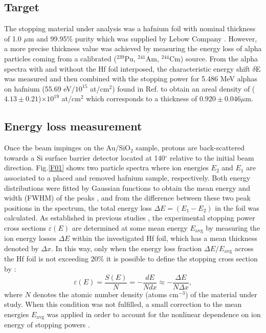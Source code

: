 \documentclass[aps,pra,reprint,groupedaddress]{revtex4-1}
\begin{document}
\subsection{Target}
The stopping material under analysis was a hafnium foil with nominal thickness of 1.0 $\mu$m and 99.95\% purity which was supplied by Lebow Company \cite{Lebow}. However, a more precise thickness value was achieved by measuring the energy loss of alpha particles coming from a calibrated ($^{239}$Pu, $^{241}$Am, $^{244}$Cm) source. From the alpha spectra with and without the Hf foil interposed, the characteristic energy shift $\delta$E was measured and then combined with the stopping power for 5.486 MeV alphas on hafnium (55.69 eV/$10^{15}$ at/cm$^2$) found in Ref.\cite{Ziegler01} to obtain an areal density of ($4.13 \pm 0.21$)$\times 10^{19}$ at/cm$^2$ which corresponds to a thickness of $0.920\pm0.046 \mu$m.
\subsection{Energy loss measurement}
Once the beam impinges on the Au/SiO$_2$ sample, protons are back-scattered towards a Si surface barrier detector located at 140$^{\circ}$ relative to the initial beam direction. Fig.\ref{F01} shows two particle spectra where ion energies $E_2$ and $E_1$ are associated to a placed and removed hafnium sample, respectively. Both energy distributions were fitted by Gaussian functions to obtain the mean energy and width (FWHM) of the peaks \cite{Sun01}, and from the difference between these two peak positions in the spectrum, the total energy loss $\Delta E = (E_1 - E_2)$ in the foil was calculated. As established in previous studies \cite{Miranda01, Damache02}, the experimental stopping power cross sections $\varepsilon (E) $ are determined at some mean energy $E_{\mathrm{avg}}$ by measuring the ion energy losses $\Delta E$ within the investigated Hf foil, which has a mean thickness denoted by $\Delta x$. In this way, only when the energy loss fraction $\Delta E/E_{\mathrm{avg}}$ across the Hf foil is not exceeding 20\%
it is possible to define the stopping cross section by \cite{Raisanen01,Schulz01}:
\begin{equation}\label{eq:stcross}
 \varepsilon (E) = \frac{S(E)}{N} = -\frac{dE}{N dx} \approx -\frac{\Delta E}{N \Delta x},
\end{equation}
where $N$ denotes the atomic number density (atoms cm$^{-3}$) of the material under study. When this condition was not fulfilled, a small correction to the mean energies $E_{\mathrm{avg}}$ was applied in order to account for the nonlinear dependence on ion energy of stopping powers \cite{Chilton,Rajatora}.
\end{document}
